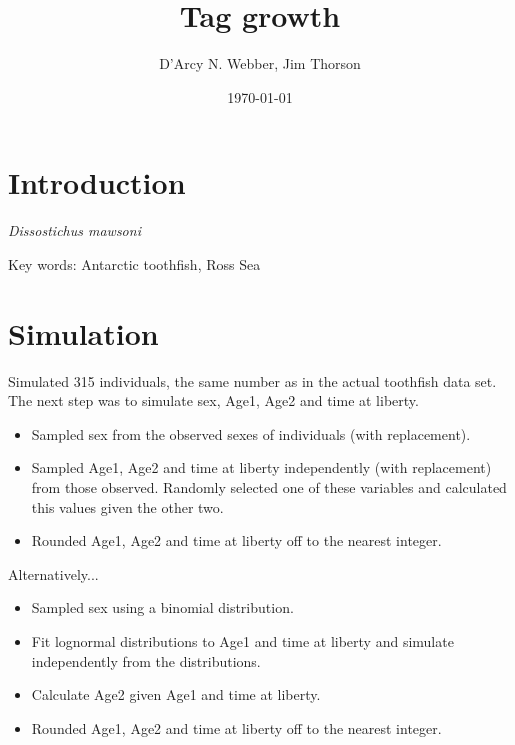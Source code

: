 \documentclass[11pt, a4paper]{article}
\title{Tag growth}
\author{D'Arcy N. Webber, Jim Thorson}
\date{\today}
\begin{document}
\maketitle

\section{Introduction}
\textit{Dissostichus mawsoni}

Key words: Antarctic toothfish, Ross Sea


\section{Simulation}
Simulated 315 individuals, the same number as in the actual toothfish data
set. The next step was to simulate sex, Age1, Age2 and time at liberty.

\begin{itemize}
\item Sampled sex from the observed sexes of individuals (with replacement).
\item Sampled Age1, Age2 and time at liberty independently (with replacement)
  from those observed. Randomly selected one of these variables and calculated
  this values given the other two.
\item Rounded Age1, Age2 and time at liberty off to the nearest integer.
\end{itemize}

Alternatively...

\begin{itemize}
\item Sampled sex using a binomial distribution.
\item Fit lognormal distributions to Age1 and time at liberty and simulate
  independently from the distributions.
\item Calculate Age2 given Age1 and time at liberty.
\item Rounded Age1, Age2 and time at liberty off to the nearest integer.
\end{itemize}
\end{document}
